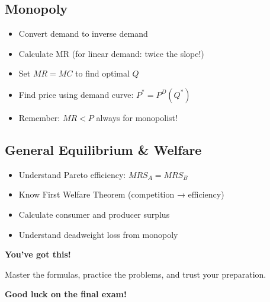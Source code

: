 \documentclass[10pt,letterpaper]{article}
\begin{document}
\begin{tcolorbox}[colback=green!10,colframe=green!70,arc=3mm]
\subsection*{Monopoly}
\begin{itemize}
  \item[$\square$] Convert demand to inverse demand
  \item[$\square$] Calculate MR (for linear demand: twice the slope!)
  \item[$\square$] Set $MR = MC$ to find optimal $Q$
  \item[$\square$] Find price using demand curve: $P^* = P^D(Q^*)$
  \item[$\square$] Remember: $MR < P$ always for monopolist!
\end{itemize}

\subsection*{General Equilibrium \& Welfare}
\begin{itemize}
  \item[$\square$] Understand Pareto efficiency: $MRS_A = MRS_B$
  \item[$\square$] Know First Welfare Theorem (competition → efficiency)
  \item[$\square$] Calculate consumer and producer surplus
  \item[$\square$] Understand deadweight loss from monopoly
\end{itemize}
\end{tcolorbox}

\vspace{1cm}

\begin{center}
\begin{tcolorbox}[colback=yellow!20,colframe=orange!80,width=0.9\textwidth,arc=5mm]
\centering
\LARGE\textbf{You've got this!}

\large Master the formulas, practice the problems, and trust your preparation.

\textbf{Good luck on the final exam!}
\end{tcolorbox}
\end{center}
\end{document}
